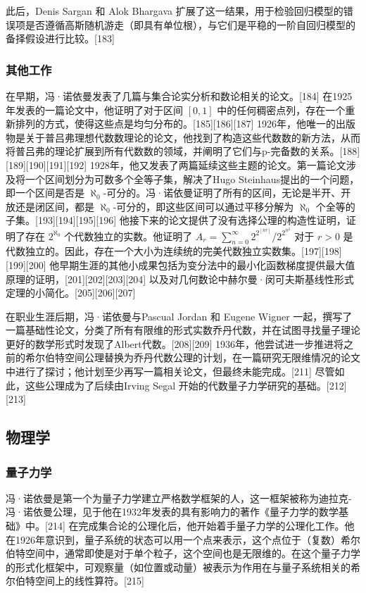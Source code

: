此后，Denis Sargan 和 Alok Bhargava 扩展了这一结果，用于检验回归模型的错误项是否遵循高斯随机游走（即具有单位根），与它们是平稳的一阶自回归模型的备择假设进行比较。[183]
\subsubsection{其他工作}  
在早期，冯·诺依曼发表了几篇与集合论实分析和数论相关的论文。[184] 在1925年发表的一篇论文中，他证明了对于区间 \([0,1]\) 中的任何稠密点列，存在一个重新排列的方式，使得这些点是均匀分布的。[185][186][187] 1926年，他唯一的出版物是关于普吕弗理想代数数理论的论文，他找到了构造这些代数数的新方法，从而将普吕弗的理论扩展到所有代数数的领域，并阐明了它们与p-完备数的关系。[188][189][190][191][192] 1928年，他又发表了两篇延续这些主题的论文。第一篇论文涉及将一个区间划分为可数多个全等子集，解决了Hugo Steinhaus提出的一个问题，即一个区间是否是 \(\aleph_0\)-可分的。冯·诺依曼证明了所有的区间，无论是半开、开放还是闭区间，都是 \(\aleph_0\)-可分的，即这些区间可以通过平移分解为 \(\aleph_0\) 个全等的子集。[193][194][195][196] 他接下来的论文提供了没有选择公理的构造性证明，证明了存在 \(2^{\aleph_0}\) 个代数独立的实数。他证明了 \(A_r = \sum_{n=0}^{\infty} 2^{2^{[nr]}} / 2^{2^{n^2}}\) 对于 \(r > 0\) 是代数独立的。因此，存在一个大小为连续统的完美代数独立实数集。[197][198][199][200] 他早期生涯的其他小成果包括为变分法中的最小化函数梯度提供最大值原理的证明，[201][202][203][204] 以及对几何数论中赫尔曼·闵可夫斯基线性形式定理的小简化。[205][206][207]

在职业生涯后期，冯·诺依曼与Pascual Jordan 和 Eugene Wigner 一起，撰写了一篇基础性论文，分类了所有有限维的形式实数乔丹代数，并在试图寻找量子理论更好的数学形式时发现了Albert代数。[208][209] 1936年，他尝试进一步推进将之前的希尔伯特空间公理替换为乔丹代数公理的计划，在一篇研究无限维情况的论文中进行了探讨；他计划至少再写一篇相关论文，但最终未能完成。[211] 尽管如此，这些公理成为了后续由Irving Segal 开始的代数量子力学研究的基础。[212][213]
\subsection{物理学}  
\subsubsection{量子力学}  
冯·诺依曼是第一个为量子力学建立严格数学框架的人，这一框架被称为迪拉克-冯·诺依曼公理，见于他在1932年发表的具有影响力的著作《量子力学的数学基础》中。[214] 在完成集合论的公理化后，他开始着手量子力学的公理化工作。他在1926年意识到，量子系统的状态可以用一个点来表示，这个点位于（复数）希尔伯特空间中，通常即使是对于单个粒子，这个空间也是无限维的。在这个量子力学的形式化框架中，可观察量（如位置或动量）被表示为作用在与量子系统相关的希尔伯特空间上的线性算符。[215]

